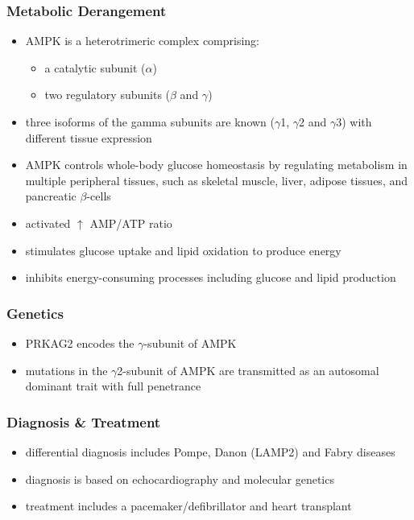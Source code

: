 \documentclass{scrartcl}
\begin{document}
\subsubsection{Metabolic Derangement}
\label{sec:org96688cc}
\begin{itemize}
\item AMPK is a heterotrimeric complex comprising:
\begin{itemize}
\item a catalytic subunit (\(\alpha\))
\item two regulatory subunits (\(\beta\) and \(\gamma\))
\end{itemize}
\item three isoforms of the gamma subunits are known (\(\gamma\)1, \(\gamma\)2 and \(\gamma\)3) with different tissue
expression
\item AMPK controls whole-body glucose homeostasis by regulating metabolism in multiple peripheral tissues, such as
skeletal muscle, liver, adipose tissues, and pancreatic \(\beta\)-cells
\item activated \(\uparrow\) AMP/ATP ratio
\item stimulates glucose uptake and lipid oxidation to produce energy
\item inhibits energy-consuming processes including glucose and lipid production
\end{itemize}
\subsubsection{Genetics}
\label{sec:orgde8f433}
\begin{itemize}
\item PRKAG2 encodes the \(\gamma\)-subunit of AMPK
\item mutations in the \(\gamma\)2-subunit of AMPK are transmitted as an
autosomal dominant trait with full penetrance
\end{itemize}

\subsubsection{Diagnosis \& Treatment}
\label{sec:org5385f03}
\begin{itemize}
\item differential diagnosis includes Pompe, Danon (LAMP2) and Fabry diseases
\item diagnosis is based on echocardiography and molecular genetics
\item treatment includes a pacemaker/defibrillator and heart transplant
\end{itemize}
\end{document}
